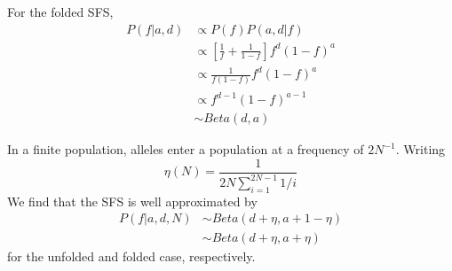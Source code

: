 \documentclass[10pt,a4paper]{article}
\begin{document}
For the folded SFS,
\begin{align}
P(f | a, d) &\propto P(f) P(a, d|f) \nonumber\\
&\propto \left[ \frac{1}{f} + \frac{1}{1-f}\right] f^d (1-f)^a\nonumber\\
&\propto \frac{1}{f(1-f)} f^d (1-f)^a\nonumber\\
&\propto f^{d-1} (1-f)^{a-1} \nonumber\\
&\sim Beta(d, a)
\end{align}

In a finite population, alleles enter a population at a frequency of $2N^{-1}$. Writing
$$\eta(N) = \frac{1}{2N \sum_{i=1}^{2N-1}1/i}$$
We find that the SFS is well approximated by 
\begin{align}
P(f | a, d, N) &\sim Beta(d + \eta, a+1 - \eta)\\
&\sim Beta(d + \eta, a + \eta)
\end{align}
for the unfolded and folded case, respectively.
		
\end{document}
